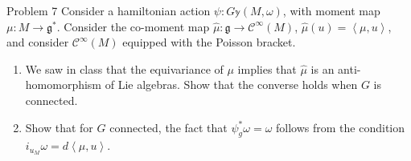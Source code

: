 \begin{thing3}{Problem 7}\leavevmode
Consider a hamiltonian action $\psi:G \mathbb{y}(M,\omega)$, with moment map $\mu:M\to\mathfrak{g}^*$. Consider the co-moment map $\hat{\mu}:\mathfrak{g}\to\mathcal{C}^\infty(M)$, $\hat{\mu}(u)=\left<\mu,u\right>$, and consider $\mathcal{C}^\infty(M)$ equipped with the Poisson bracket.
\begin{enumerate}[label=(\alph*)]
\item We saw in class that the equivariance of $\mu$ implies that $\hat{\mu}$ is an anti-homomorphism of Lie algebras. Show that the converse holds when $G$ is connected.
\item Show that for $G$ connected, the fact that $\psi^*_g\omega=\omega$ follows from the condition $i_{u_M}\omega=d \left<\mu,u\right>$.
\end{enumerate}
\end{thing3}

